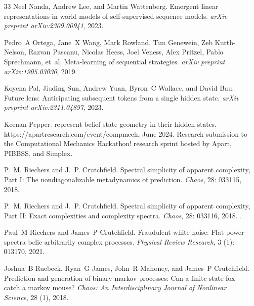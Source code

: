 \documentclass{article}
\begin{document}
\begin{thebibliography}{33}
Neel Nanda, Andrew Lee, and Martin Wattenberg.
\newblock Emergent linear representations in world models of self-supervised sequence models.
\newblock \emph{arXiv preprint arXiv:2309.00941}, 2023.

Pedro~A Ortega, Jane~X Wang, Mark Rowland, Tim Genewein, Zeb Kurth-Nelson, Razvan Pascanu, Nicolas Heess, Joel Veness, Alex Pritzel, Pablo Sprechmann, et~al.
\newblock Meta-learning of sequential strategies.
\newblock \emph{arXiv preprint arXiv:1905.03030}, 2019.

Koyena Pal, Jiuding Sun, Andrew Yuan, Byron~C Wallace, and David Bau.
\newblock Future lens: Anticipating subsequent tokens from a single hidden state.
\newblock \emph{arXiv preprint arXiv:2311.04897}, 2023.

Keenan Pepper.
 represent belief state geometry in their hidden states.
\newblock https://apartresearch.com/event/compmech, June 2024.
\newblock Research submission to the Computational Mechanics Hackathon! research sprint hosted by Apart, PIBBSS, and Simplex.

P.~M. Riechers and J.~P. Crutchfield.
\newblock Spectral simplicity of apparent complexity, {Part I}: {The} nondiagonalizable metadynamics of prediction.
\newblock \emph{Chaos}, 28: 033115, 2018{}.
\newblock {}.

P.~M. Riechers and J.~P. Crutchfield.
\newblock Spectral simplicity of apparent complexity, {Part II}: {Exact} complexities and complexity spectra.
\newblock \emph{Chaos}, 28: 033116, 2018{}.
\newblock {}.

Paul~M Riechers and James~P Crutchfield.
\newblock Fraudulent white noise: Flat power spectra belie arbitrarily complex processes.
\newblock \emph{Physical Review Research}, 3 (1): 013170, 2021.

Joshua~B Ruebeck, Ryan~G James, John~R Mahoney, and James~P Crutchfield.
\newblock Prediction and generation of binary markov processes: Can a finite-state fox catch a markov mouse?
\newblock \emph{Chaos: An Interdisciplinary Journal of Nonlinear Science}, 28 (1), 2018.


\end{thebibliography}
\end{document}
